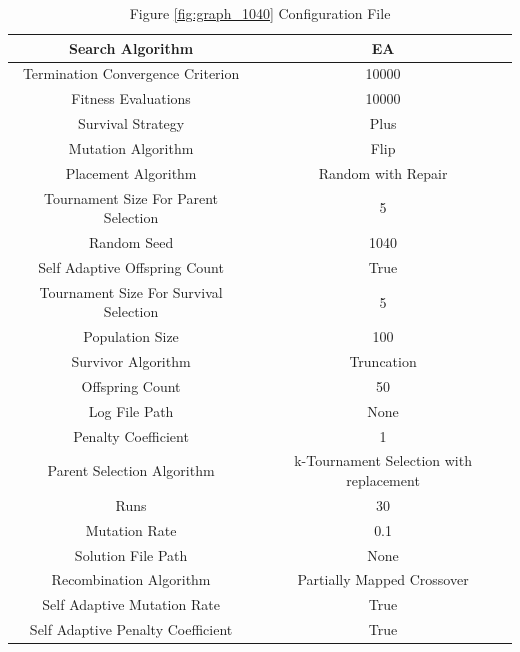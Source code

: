 \documentclass{standalone}
\begin{document}
\begin{table}[!htb]
	\centering
	\caption{Figure \ref{fig:graph_1040} Configuration File}
	\label{tab:graph_1040}
	\begin{tabular}{| c | c |}
		\hline
		Search Algorithm		& EA		 \\
		\hline
		Termination Convergence Criterion		& 10000		 \\
		\hline
		Fitness Evaluations		& 10000		 \\
		\hline
		Survival Strategy		& Plus		 \\
		\hline
		Mutation Algorithm		& Flip		 \\
		\hline
		Placement Algorithm		& Random with Repair		 \\
		\hline
		Tournament Size For Parent Selection		& 5		 \\
		\hline
		Random Seed		& 1040		 \\
		\hline
		Self Adaptive Offspring Count		& True		 \\
		\hline
		Tournament Size For Survival Selection		& 5		 \\
		\hline
		Population Size		& 100		 \\
		\hline
		Survivor Algorithm		& Truncation		 \\
		\hline
		Offspring Count		& 50		 \\
		\hline
		Log File Path		& None		 \\
		\hline
		Penalty Coefficient		& 1		 \\
		\hline
		Parent Selection Algorithm		& k-Tournament Selection with replacement		 \\
		\hline
		Runs		& 30		 \\
		\hline
		Mutation Rate		& 0.1		 \\
		\hline
		Solution File Path		& None		 \\
		\hline
		Recombination Algorithm		& Partially Mapped Crossover		 \\
		\hline
		Self Adaptive Mutation Rate		& True		 \\
		\hline
		Self Adaptive Penalty Coefficient		& True		 \\
		\hline
	\end{tabular}
\end{table}
\end{document}
